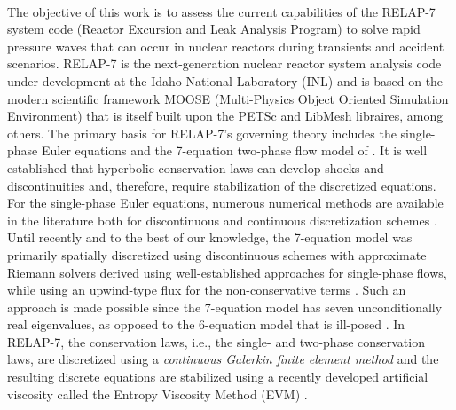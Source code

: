 \documentclass{inputs/mc2015}
\begin{document}

 \\
The objective of this work is to assess the current capabilities of the RELAP-7 system code (Reactor Excursion and Leak Analysis Program) \cite{Berry_Peterson_2014} to solve rapid pressure waves that can occur in nuclear reactors during transients and accident scenarios. RELAP-7 is the next-generation nuclear reactor system analysis code under development at the Idaho National Laboratory (INL) and is based on the modern scientific framework  MOOSE \cite{MOOSE} (Multi-Physics Object Oriented Simulation Environment) that is itself built upon the PETSc and LibMesh libraires, among others.
%
The primary basis for RELAP-7's governing theory includes the single-phase Euler equations \cite{Toro} and the 7-equation two-phase flow model of \cite{SEM, Berry_MC_2014}. It is well established that hyperbolic conservation laws can develop shocks and discontinuities \cite{Leveque} and, therefore, require stabilization of the discretized equations. For the single-phase Euler equations, numerous numerical methods are available in the literature both for discontinuous and continuous discretization schemes
\cite{Toro, Lapidus_paper, LMP, Lapidus_book, Roe, SUPG}. Until recently and to the best of our knowledge, the 7-equation model was primarily spatially discretized using discontinuous schemes with approximate 
Riemann solvers derived using well-established approaches for single-phase flows, while using an upwind-type flux for the non-conservative terms 
\cite{Saurel_2001a, Saurel_2001b, Li_2004, Zein_2010, Ambroso_2012}. Such an approach is made possible since the 7-equation model has seven unconditionally real eigenvalues, as opposed to the 6-equation model that is ill-posed \cite{stewart-wendroff-1984}. In RELAP-7, the conservation laws, i.e., the single- and two-phase conservation laws, are discretized using a \emph{continuous Galerkin finite element method} and the resulting discrete equations are stabilized using a recently developed artificial viscosity called the Entropy Viscosity Method (EVM) \cite{jlg1, jlg2}.
\end{document}
